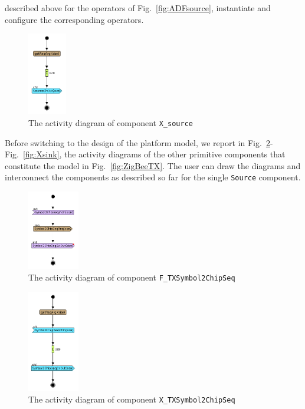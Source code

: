 \documentclass{llncs}
\begin{document}
described above for the operators of Fig.~\ref{fig:ADFsource}, instantiate and configure the corresponding operators.
%
\begin{figure}[!htbp]
	\centering
	\includegraphics[width=0.15\textwidth]{figures/screenshot/ADXsource.png}
	\caption{The activity diagram of component \texttt{X\_source}}
	\label{fig:ADXsource}
\end{figure}
%
Before switching to the design of the platform model, we report in Fig.~\ref{fig:FSymbol2ChipSeq}-Fig.~\ref{fig:Xsink},
the activity diagrams of the other primitive components that constitute the
model in Fig.~\ref{fig:ZigBeeTX}. The user can draw the diagrams and interconnect the components as described so far for the single \texttt{Source} component.
%
\begin{figure}[!htbp]
	\centering
	\includegraphics[width=0.20\textwidth]{figures/screenshot/F_Symbol2ChipSeq.png}
	\caption{The activity diagram of component \texttt{F\_TXSymbol2ChipSeq}}
	\label{fig:FSymbol2ChipSeq}
\end{figure}
%
\begin{figure}[!htbp]
	\centering
	\includegraphics[width=0.20\textwidth]{figures/screenshot/X_Symbol2ChipSeq.png}
	\caption{The activity diagram of component \texttt{X\_TXSymbol2ChipSeq}}
	\label{fig:XSymbol2ChipSeq}
\end{figure}
\end{document}
